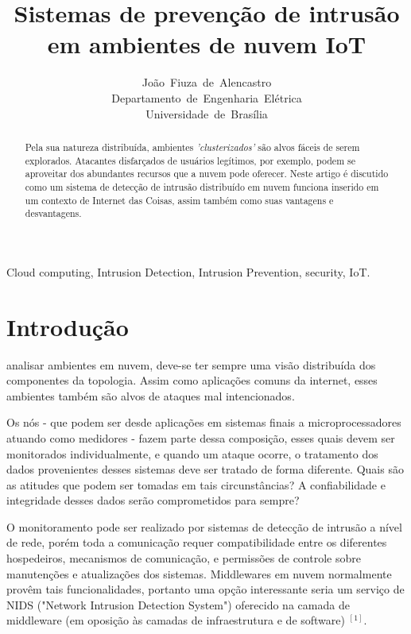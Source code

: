 \documentclass[journal]{IEEEtran}
\begin{document}
\title{Sistemas de prevenção de intrusão\\ em ambientes de nuvem IoT}


\author{João~Fiuza~de~Alencastro\\Departamento~de~Engenharia~Elétrica\\Universidade~de~Brasília}%




\maketitle


\begin{abstract}
Pela sua natureza distribuída, ambientes \textit{'clusterizados'} são alvos fáceis de serem explorados. Atacantes disfarçados de usuários legítimos, por exemplo, podem se aproveitar dos abundantes recursos que a nuvem pode oferecer. Neste artigo é discutido como um sistema de detecção de intrusão distribuído em nuvem funciona inserido em um contexto de Internet das Coisas, assim também como suas vantagens e desvantagens.%
\end{abstract}

\begin{IEEEkeywords}
Cloud computing, Intrusion Detection, Intrusion Prevention, security, IoT.
\end{IEEEkeywords}


\IEEEpeerreviewmaketitle



\section{Introdução}
 analisar ambientes em nuvem, deve-se ter sempre uma visão distribuída dos componentes da topologia. Assim como aplicações comuns da internet, esses ambientes também são alvos de ataques mal intencionados. \par
Os nós - que podem ser desde aplicações em sistemas finais a microprocessadores atuando como medidores - fazem parte dessa composição, esses quais devem ser monitorados individualmente, e quando um ataque ocorre, o tratamento dos dados provenientes desses sistemas deve ser tratado de forma diferente. Quais são as atitudes que podem ser tomadas em tais circunstâncias? A confiabilidade e integridade desses dados serão comprometidos para sempre? \par
O monitoramento pode ser realizado por sistemas de detecção de intrusão a nível de rede, porém toda a comunicação requer compatibilidade entre os diferentes hospedeiros, mecanismos de comunicação, e permissões de controle sobre manutenções e atualizações dos sistemas. Middlewares em nuvem normalmente provêm tais funcionalidades, portanto uma opção interessante seria um serviço de NIDS ("Network Intrusion Detection System") oferecido na camada de middleware (em oposição às camadas de infraestrutura e de software) $^{ [1] }$.
\end{document}

